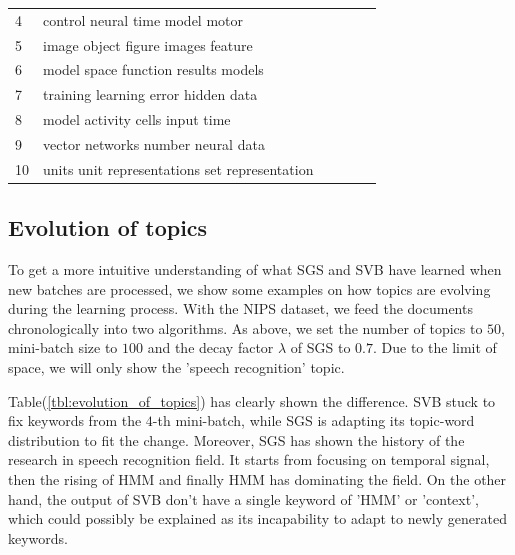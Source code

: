 \documentclass{article}
\begin{document}
\begin{table}[t]
\begin{center}
\begin{small}
\begin{tabular}{llllll}
4 & control neural time model motor  \\
5 & image object figure images feature \\
6 & model space function results models \\
7 & training learning error hidden data \\
8 & model activity cells input time \\
9 & vector networks number neural data \\ 
10 & units unit representations set representation \\
\hline
\hline
\end{tabular}
\end{small}
\end{center}
\vskip -0.1in
\end{table}

\subsection{Evolution of topics}
To get a more intuitive understanding of what SGS and SVB have learned when new batches are processed, we show some examples on how topics are evolving during the learning process. With the NIPS dataset, we feed the documents chronologically into two algorithms. As above, we set the number of topics to $50$, mini-batch size to $100$ and the decay factor $\lambda$ of SGS to $0.7$. Due to the limit of space, we will only show the 'speech recognition' topic.

Table(\ref{tbl:evolution_of_topics}) has clearly shown the difference. SVB stuck to fix keywords from the $4$-th mini-batch, while SGS is adapting its topic-word distribution to fit the change. Moreover, SGS has shown the history of the research in speech recognition field. It starts from focusing on temporal signal, then the rising of HMM and finally HMM has dominating the field. On the other hand, the output of SVB don't have a single keyword of 'HMM' or 'context', which could possibly be explained as its incapability to adapt to newly generated keywords.
\end{document}
